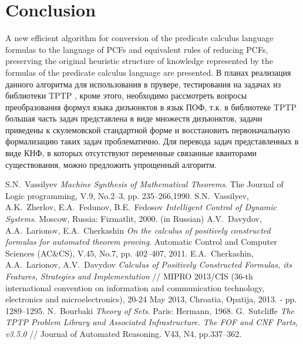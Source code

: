 \documentclass[a4paper,12pt]{article}
\begin{document}
\section{Conclusion}
A new efficient algorithm for conversion of the predicate calculus language formulas to the language of PCFs and equivalent rules of reducing PCFs, preserving the original heuristic structure of knowledge represented by the formulas of the predicate calculus language are presented. В планах реализация данного алгоритма для использования в прувере, тестирования на задачах из библиотеки TPTP \cite{tptp}, кроме этого, необходимо рассмотреть вопросы преобразования формул языка дизъюнктов в язык ПОФ, т.к. в библиотеке TPTP большая часть задач представлена в виде множеств дизъюнктов, задачи приведены к скулемовской стандартной форме и восстановить первоначальную формализацию таких задач проблематично. Для перевода задач представленных в виде КНФ, в которых отсутствуют переменные связанные кванторами существования, можно предложить упрощенный алгоритм. 

\begin{thebibliography}{9}
 S.N.~Vassilyev \emph{Machine Synthesis of Mathematical Theorems}. The Journal of Logic programming, V.9, No.2--3, pp. 235--266,1990.
 S.N.~Vassilyev, A.K.~Zherlov, E.A.~Fedunov, B.E.~Fedosov \emph{Intelligent Control of Dynamic Systems}. Moscow, Russia: Fizmatlit, 2000. (in Russian)
 A.V.~Davydov, A.A.~Larionov, E.A.~Cherkashin \emph{On the calculus of positively constructed formulas for automated theorem proving}. Automatic Control and Computer Sciences (AC\&CS), V.45, No.7, pp. 402--407, 2011.
 E.A.~Cherkashin, A.A.~Larionov, A.V.~Davydov \emph{Calculus of Positively Constructed Formulas, its Features, Strategies and Implementation} // MIPRO 2013/CIS (36-th international convention on information and communication technology, electronics and microelectronics), 20-24 May 2013, Chroatia, Opatija, 2013. - pp. 1289--1295.
 N.~Bourbaki \emph{Theory of Sets}. Paris: Hermann, 1968.
 G.~Sutcliffe \emph{The TPTP Problem Library and Associated Infrastructure. The FOF and CNF Parts, v3.5.0} // Journal of Automated Reasoning. V43, N4, pp.337--362.
\end{thebibliography}
\end{document}
